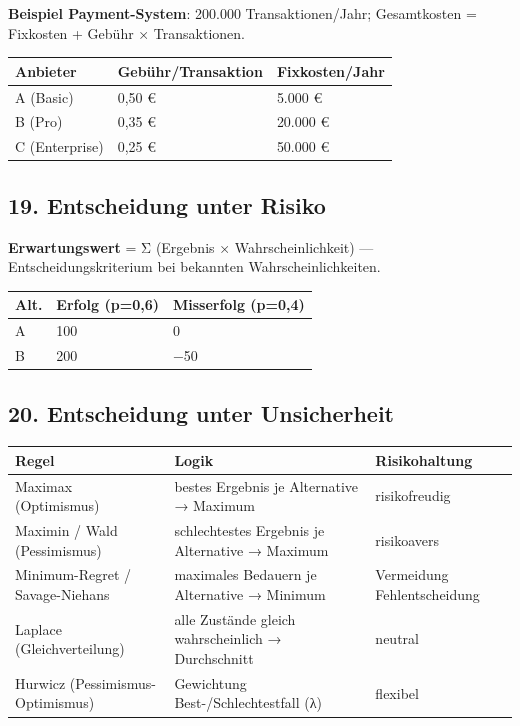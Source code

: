 \documentclass[11pt, a4paper]{article}
\begin{document}
\textbf{Beispiel Payment-System}: 200.000 Transaktionen/Jahr; Gesamtkosten = Fixkosten + Gebühr × Transaktionen.



{\small
\begin{tabularx}{\linewidth}{XXX}
\hline
\rowcolor{tableheadbg}
{\color{white}\textbf{Anbieter}} & {\color{white}\textbf{Gebühr/Transaktion}} & {\color{white}\textbf{Fixkosten/Jahr}} \\[2pt]
\hline
\endhead
\hline
\endfoot
A (Basic) & 0,50 € & 5.000 € \\
B (Pro) & 0,35 € & 20.000 € \\
C (Enterprise) & 0,25 € & 50.000 € \\
\end{tabularx}
}



\subsection{19. Entscheidung unter Risiko}

\textbf{Erwartungswert} = Σ (Ergebnis × Wahrscheinlichkeit) — Entscheidungskriterium bei bekannten Wahrscheinlichkeiten.



{\small
\begin{tabularx}{\linewidth}{XXX}
\hline
\rowcolor{tableheadbg}
{\color{white}\textbf{Alt.}} & {\color{white}\textbf{Erfolg (p=0,6)}} & {\color{white}\textbf{Misserfolg (p=0,4)}} \\[2pt]
\hline
\endhead
\hline
\endfoot
A & 100 & 0 \\
B & 200 & −50 \\
\end{tabularx}
}



\subsection{20. Entscheidung unter Unsicherheit}


{\small
\begin{tabularx}{\linewidth}{XXX}
\hline
\rowcolor{tableheadbg}
{\color{white}\textbf{Regel}} & {\color{white}\textbf{Logik}} & {\color{white}\textbf{Risikohaltung}} \\[2pt]
\hline
\endhead
\hline
\endfoot
Maximax (Optimismus) & bestes Ergebnis je Alternative → Maximum & risikofreudig \\
Maximin / Wald (Pessimismus) & schlechtestes Ergebnis je Alternative → Maximum & risikoavers \\
Minimum-Regret / Savage-Niehans & maximales Bedauern je Alternative → Minimum & Vermeidung Fehlentscheidung \\
Laplace (Gleichverteilung) & alle Zustände gleich wahrscheinlich → Durchschnitt & neutral \\
Hurwicz (Pessimismus-Optimismus) & Gewichtung Best-/Schlechtestfall (λ) & flexibel \\
\end{tabularx}
}
\end{document}
